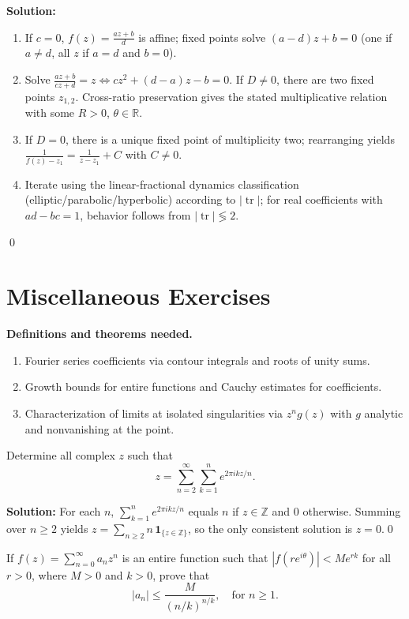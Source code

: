 \bigskip\noindent\textbf{Solution:}
\begin{enumerate}[label=(\alph*)]
\item If $c=0$, $f(z)=\frac{a z+b}{d}$ is affine; fixed points solve $(a-d)z+b=0$ (one if $a\ne d$, all $z$ if $a=d$ and $b=0$).
\item Solve $\frac{a z+b}{c z+d}=z\iff c z^2+(d-a)z-b=0$. If $D\ne0$, there are two fixed points $z_{1,2}$. Cross-ratio preservation gives the stated multiplicative relation with some $R>0$, $\theta\in\mathbb R$.
\item If $D=0$, there is a unique fixed point of multiplicity two; rearranging yields $\frac{1}{f(z)-z_1}=\frac{1}{z-z_1}+C$ with $C\ne0$.
\item Iterate using the linear-fractional dynamics classification (elliptic/parabolic/hyperbolic) according to $|\operatorname{tr}|$; for real coefficients with $ad-bc=1$, behavior follows from $|\operatorname{tr}|\lessgtr2$.
\end{enumerate}\qed
\section{Miscellaneous Exercises}

\noindent\textbf{Definitions and theorems needed.}
\begin{enumerate}[label=(\alph*)]
\item Fourier series coefficients via contour integrals and roots of unity sums.
\item Growth bounds for entire functions and Cauchy estimates for coefficients.
\item Characterization of limits at isolated singularities via $z^n g(z)$ with $g$ analytic and nonvanishing at the point.
\end{enumerate}



\begin{problembox}
Determine all complex \( z \) such that
\[ z = \sum_{n=2}^{\infty} \sum_{k=1}^{n} e^{2\pi i k z / n}. \]
\end{problembox}

\bigskip\noindent\textbf{Solution:}
For each $n$, $\sum_{k=1}^n e^{2\pi i k z/n}$ equals $n$ if $z\in\mathbb Z$ and $0$ otherwise. Summing over $n\ge2$ yields $z=\sum_{n\ge2} n\,\mathbf 1_{\{z\in\mathbb Z\}}$, so the only consistent solution is $z=0$.\qed


\begin{problembox}
If \( f(z) = \sum_{n=0}^{\infty} a_n z^n \) is an entire function such that \( |f(r e^{i\theta})| < M e^{r k} \) for all \( r > 0 \), where \( M > 0 \) and \( k > 0 \), prove that
\[ |a_n| \leq \frac{M}{(n/k)^{n/k}}, \quad \text{for } n \geq 1. \]
\end{problembox}


